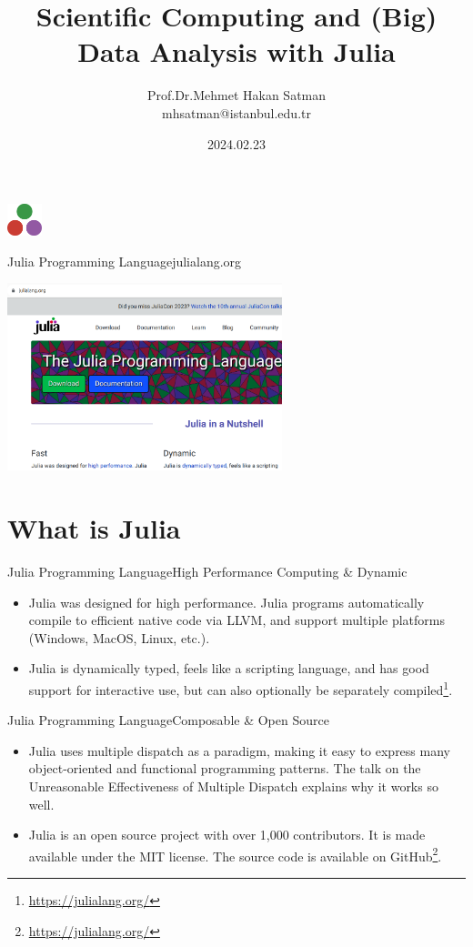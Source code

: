\documentclass[11pt]{beamer}
\author{Prof.Dr.Mehmet Hakan Satman \\ mhsatman@istanbul.edu.tr}
\title{Scientific Computing and (Big) Data Analysis with Julia}
\institute{Istanbul University}
\date{2024.02.23}
\begin{document}
\begin{frame}
\includegraphics[width=1cm]{images/julia.png}
\titlepage
\end{frame}


\begin{frame}[fragile]{Julia Programming Language}{julialang.org}
	\begin{center}
		\includegraphics[width=8cm]{images/thesite.png}
	\end{center}
\end{frame}

\section{What is Julia}
\begin{frame}[fragile]{Julia Programming Language}{High Performance Computing \& Dynamic}
\begin{itemize}
	\item Julia was designed for high performance. Julia programs automatically compile to efficient native code via LLVM, and support multiple platforms (Windows, MacOS, Linux, etc.).
	
	\item Julia is dynamically typed, feels like a scripting language, and has good support for interactive use, but can also optionally be separately compiled\footnote{\url{https://julialang.org/}}.
\end{itemize}
\end{frame}



\begin{frame}[fragile]{Julia Programming Language}{Composable \& Open Source}
	\begin{itemize}
		\item Julia uses multiple dispatch as a paradigm, making it easy to express many object-oriented and functional programming patterns. The talk on the Unreasonable Effectiveness of Multiple Dispatch explains why it works so well.
		\item Julia is an open source project with over 1,000 contributors. It is made available under the MIT license. The source code is available on GitHub\footnote{\url{https://julialang.org/}}.
	\end{itemize}
\end{frame}
\end{document}
